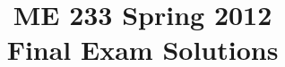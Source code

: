 \documentclass[letterpaper,10pt]{article}
\begin{document}
\thispagestyle{empty}

\title{\bf ME 233 Spring 2012 \\ Final Exam Solutions}
\date{}
\maketitle









\end{document}
